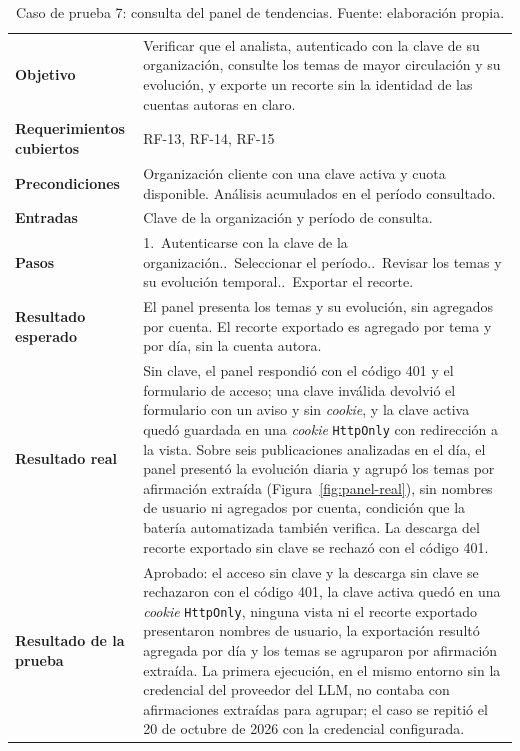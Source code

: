\begin{small}
\begin{longtable}{@{}>{\raggedright\arraybackslash}p{3.4cm} p{11.8cm}@{}}
  \caption{Caso de prueba 7: consulta del panel de tendencias. Fuente: elaboración propia.}
  \label{tab:cp-07} \\
    \hline
    \textbf{Objetivo} & Verificar que el analista, autenticado con la clave de su organización, consulte los temas de mayor circulación y su evolución, y exporte un recorte sin la identidad de las cuentas autoras en claro. \\
    \textbf{Requerimientos cubiertos} & RF-13, RF-14, RF-15 \\
    \textbf{Precondiciones} & Organización cliente con una clave activa y cuota disponible. Análisis acumulados en el período consultado. \\
    \textbf{Entradas} & Clave de la organización y período de consulta. \\
    \textbf{Pasos} & 1.~Autenticarse con la clave de la organización.\newline 2.~Seleccionar el período.\newline 3.~Revisar los temas y su evolución temporal.\newline 4.~Exportar el recorte. \\
    \textbf{Resultado esperado} & El panel presenta los temas y su evolución, sin agregados por cuenta. El recorte exportado es agregado por tema y por día, sin la cuenta autora. \\
    \textbf{Resultado real} & Sin clave, el panel respondió con el código 401 y el formulario de acceso; una clave inválida devolvió el formulario con un aviso y sin \textit{cookie}, y la clave activa quedó guardada en una \textit{cookie} \texttt{HttpOnly} con redirección a la vista. Sobre seis publicaciones analizadas en el día, el panel presentó la evolución diaria y agrupó los temas por afirmación extraída (Figura~\ref{fig:panel-real}), sin nombres de usuario ni agregados por cuenta, condición que la batería automatizada también verifica. La descarga del recorte exportado sin clave se rechazó con el código 401. \\
    \textbf{Resultado de la prueba} & Aprobado: el acceso sin clave y la descarga sin clave se rechazaron con el código 401, la clave activa quedó en una \textit{cookie} \texttt{HttpOnly}, ninguna vista ni el recorte exportado presentaron nombres de usuario, la exportación resultó agregada por día y los temas se agruparon por afirmación extraída. La primera ejecución, en el mismo entorno sin la credencial del proveedor del LLM, no contaba con afirmaciones extraídas para agrupar; el caso se repitió el 20 de octubre de 2026 con la credencial configurada. \\
    \hline
\end{longtable}
\end{small}

